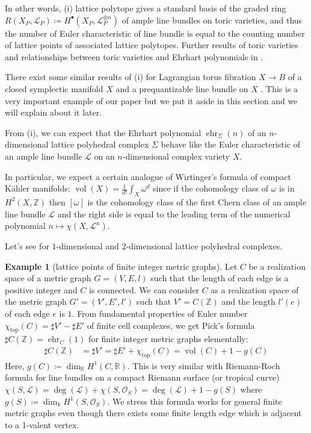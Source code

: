 \documentclass[a4paper,dvipdfmx,reqno,12pt]{amsart}
\theoremstyle{definition}
\newtheorem{Eg}[Thm]{Example}
\newcommand{\deq}{\coloneqq}
\newcommand{\R}{\mathbb{R}}%
\newcommand{\Z}{\mathbb{Z}}%
\newcommand{\mcal}[1]{\mathcal{#1}}%
\newcommand{\opn}[1]{\operatorname{#1}}
\numberwithin{equation}{section}
\begin{document}
In other words, (i) lattice polytope gives a standard basis of the graded ring $R(X_{P},\mcal{L}_P)\deq H^{\bullet}(X_{P},\mcal{L}_P^{\otimes n})$  of ample line bundles on toric varieties, and thus the number of Euler characteristic of line bundle is equal to the counting number of lattice points of associated lattice polytopes. Further results of toric varieties and relationships between toric varieties and Ehrhart polynomials in \cite{coxToricVarieties2011a}.

There exist some similar results of (i) for Lagrangian torus fibration $X \to B$ of a closed symplectic manifold $X$ and a prequantizable line bundle on $X$ \cite{MR1461965}. This is a very important example of our paper but we put it aside in this section and we will explain about it later.

From (i), we can expect that the Ehrhart polynomial
$\opn{ehr}_{\Sigma}(n)$ of an $n$-dimensional lattice polyhedral complex
$\Sigma$ behave like the Euler characteristic of
an ample line bundle $\mcal{L}$ on
an $n$-dimensional complex variety $X$.

In particular, we expect a certain analogue of Wirtinger's formula of compact K\"ahler manifolds: $\opn{vol}(X)=\frac{1}{d!}\int_{X}\omega^{d}$ since if the cohomology class of $\omega$ is in $H^{2}(X,\Z)$ then $[\omega]$ is the cohomology class of the first Chern class of an ample line bundle $\mcal{L}$ and the right side is equal to the leading term of the numerical polynomial $n\mapsto \chi(X,\mcal{L}^{n})$.

Let's see for $1$-dimensional and $2$-dimensional lattice polyhedral complexes.

\begin{Eg}[lattice points of finite integer metric graphs]
  Let $C$ be a realization space of a metric graph $G=(V,E,l)$ such that the length of each edge is a positive integer and $C$ is connected.
  We can consider $C$ as a realization space of the metric graph $G'=(V',E',l')$ such that $V'=C(\Z)$ and the length $l'(e)$ of each edge $e$ is $1$. From fundamental properties of Euler number $\chi_{\opn{top}}(C)=\sharp V'-\sharp E'$ of finite cell complexes, we get Pick's formula $\sharp C(\Z)=\opn{ehr}_{C}(1)$ for finite integer metric graphs elementally:
  \begin{align}
    \sharp C(\Z) & =\sharp V'=\sharp E'+\chi_{\opn{top}}(C)=\opn{vol}(C)+1-g(C)
  \end{align}
  Here, $g(C)\deq \dim_{\R} H^{1}(C,\R)$.
  This is very similar with Riemann-Roch formula for line bundles on a compact Riemann surface (or tropical curve) $\chi(S,\mcal{L})=\opn{deg}(\mcal{L})+\chi(S,\mcal{O}_S)=\opn{deg}(\mcal{L})+1-g(S)$ where $g(S)\deq \dim_k H^1(S,\mcal{O}_S)$. We stress this formula works for general finite metric graphs even though there exists some finite length edge which is adjacent to a 1-valent vertex.
\end{Eg}
\end{document}
